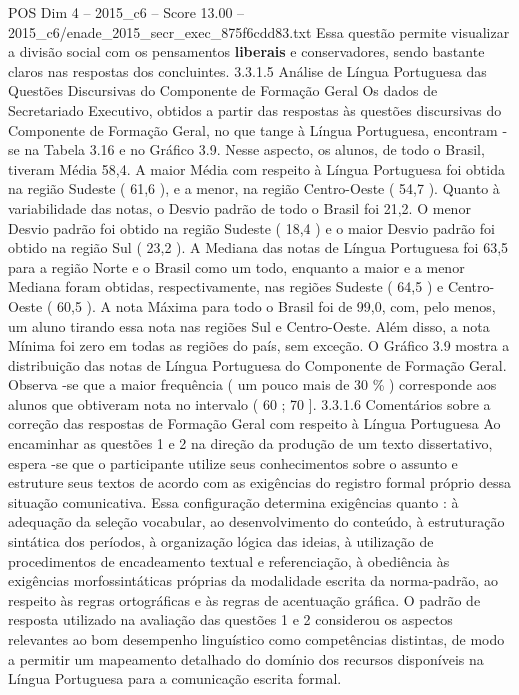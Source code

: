 \begin{textsample}{POS Dim 4 – 2015\_c6 – Score 13.00 – 2015\_c6/enade\_2015\_secr\_exec\_875f6cdd83.txt}
Essa questão permite visualizar a divisão social com os pensamentos \textbf{liberais} e conservadores, sendo bastante claros nas respostas dos concluintes. 3.3.1.5 Análise de Língua Portuguesa das Questões Discursivas do Componente de Formação Geral Os dados de Secretariado Executivo, obtidos a partir das respostas às questões discursivas do Componente de Formação Geral, no que tange à Língua Portuguesa, encontram -se na Tabela 3.16 e no Gráfico 3.9.
Nesse aspecto, os alunos, de todo o Brasil, tiveram Média 58,4.
A maior Média com respeito à Língua Portuguesa foi obtida na região Sudeste ( 61,6 ), e a menor, na região Centro-Oeste ( 54,7 ).
Quanto à variabilidade das notas, o Desvio padrão de todo o Brasil foi 21,2.
O menor Desvio padrão foi obtido na região Sudeste ( 18,4 ) e o maior Desvio padrão foi obtido na região Sul ( 23,2 ).
A Mediana das notas de Língua Portuguesa foi 63,5 para a região Norte e o Brasil como um todo, enquanto a maior e a menor Mediana foram obtidas, respectivamente, nas regiões Sudeste ( 64,5 ) e Centro-Oeste ( 60,5 ).
A nota Máxima para todo o Brasil foi de 99,0, com, pelo menos, um aluno tirando essa nota nas regiões Sul e Centro-Oeste.
Além disso, a nota Mínima foi zero em todas as regiões do país, sem exceção.
O Gráfico 3.9 mostra a distribuição das notas de Língua Portuguesa do Componente de Formação Geral.
Observa -se que a maior frequência ( um pouco mais de 30 \% ) corresponde aos alunos que obtiveram nota no intervalo ( 60 ; 70 ]. 3.3.1.6 Comentários sobre a correção das respostas de Formação Geral com respeito à Língua Portuguesa Ao encaminhar as questões 1 e 2 na direção da produção de um texto dissertativo, espera -se que o participante utilize seus conhecimentos sobre o assunto e estruture seus textos de acordo com as exigências do registro formal próprio dessa situação comunicativa.
Essa configuração determina exigências quanto : à adequação da seleção vocabular, ao desenvolvimento do conteúdo, à estruturação sintática dos períodos, à organização lógica das ideias, à utilização de procedimentos de encadeamento textual e referenciação, à obediência às exigências morfossintáticas próprias da modalidade escrita da norma-padrão, ao respeito às regras ortográficas e às regras de acentuação gráfica.
O padrão de resposta utilizado na avaliação das questões 1 e 2 considerou os aspectos relevantes ao bom desempenho linguístico como competências distintas, de modo a permitir um mapeamento detalhado do domínio dos recursos disponíveis na Língua Portuguesa para a comunicação escrita formal.

\end{textsample}
